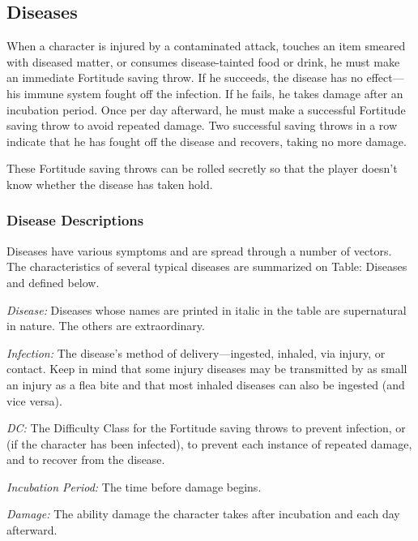 \subsection{Diseases}
When a character is injured by a contaminated attack, touches an item smeared with diseased matter, or consumes disease-tainted food or drink, he must make an immediate Fortitude saving throw. If he succeeds, the disease has no effect---his immune system fought off the infection. If he fails, he takes damage after an incubation period. Once per day afterward, he must make a successful Fortitude saving throw to avoid repeated damage. Two successful saving throws in a row indicate that he has fought off the disease and recovers, taking no more damage.

These Fortitude saving throws can be rolled secretly so that the player doesn't know whether the disease has taken hold.

\subsubsection{Disease Descriptions}
Diseases have various symptoms and are spread through a number of vectors. The characteristics of several typical diseases are summarized on Table: Diseases and defined below.

\textit{Disease:} Diseases whose names are printed in italic in the table are supernatural in nature. The others are extraordinary.

\textit{Infection:} The disease's method of delivery---ingested, inhaled, via injury, or contact. Keep in mind that some injury diseases may be transmitted by as small an injury as a flea bite and that most inhaled diseases can also be ingested (and vice versa).

\textit{DC:} The Difficulty Class for the Fortitude saving throws to prevent infection, or (if the character has been infected), to prevent each instance of repeated damage, and to recover from the disease.

\textit{Incubation Period:} The time before damage begins.

\textit{Damage:} The ability damage the character takes after incubation and each day afterward.

